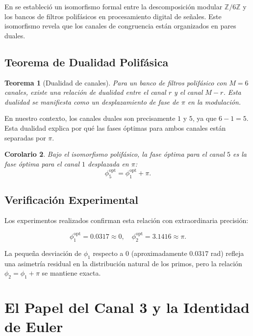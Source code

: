 \documentclass[12pt,a4paper]{article}
\theoremstyle{plain}
\newtheorem{teorema}{Teorema}[section]
\newtheorem{corolario}[teorema]{Corolario}
\theoremstyle{definition}
\theoremstyle{remark}
\begin{document}
En \cite{PeinadorDSP} se estableció un isomorfismo formal entre la descomposición modular $\mathbb{Z}/6\mathbb{Z}$ y los bancos de filtros polifásicos en procesamiento digital de señales. Este isomorfismo revela que los canales de congruencia están organizados en pares duales.

\subsection{Teorema de Dualidad Polifásica}

\begin{teorema}[Dualidad de canales]
Para un banco de filtros polifásico con $M=6$ canales, existe una relación de dualidad entre el canal $r$ y el canal $M-r$. Esta dualidad se manifiesta como un desplazamiento de fase de $\pi$ en la modulación.
\end{teorema}

En nuestro contexto, los canales duales son precisamente $1$ y $5$, ya que $6-1 = 5$. Esta dualidad explica por qué las fases óptimas para ambos canales están separadas por $\pi$.

\begin{corolario}
Bajo el isomorfismo polifásico, la fase óptima para el canal $5$ es la fase óptima para el canal $1$ desplazada en $\pi$:
\begin{equation}
\phi_5^{\text{opt}} = \phi_1^{\text{opt}} + \pi.
\end{equation}
\end{corolario}

\subsection{Verificación Experimental}

Los experimentos realizados confirman esta relación con extraordinaria precisión:

\begin{equation}
\phi_1^{\text{opt}} = 0.0317 \approx 0, \quad \phi_2^{\text{opt}} = 3.1416 \approx \pi.
\end{equation}

La pequeña desviación de $\phi_1$ respecto a $0$ (aproximadamente $0.0317$ rad) refleja una asimetría residual en la distribución natural de los primos, pero la relación $\phi_2 = \phi_1 + \pi$ se mantiene exacta.

\section{El Papel del Canal 3 y la Identidad de Euler}
\end{document}
